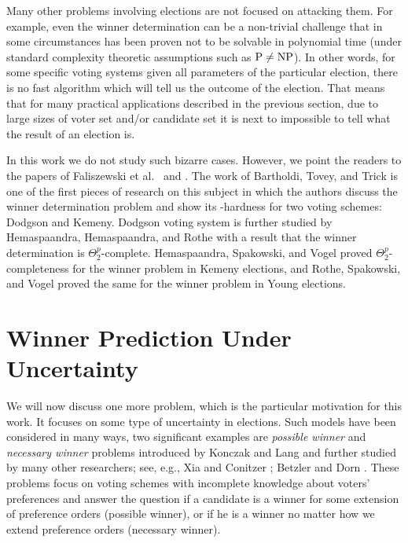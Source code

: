 Many other problems involving elections are not focused on attacking them.
For example, even the winner determination can be a non-trivial challenge that in some circumstances has been proven not to be solvable in polynomial time (under standard complexity theoretic assumptions such as $\textnormal{P}\ne\textnormal{NP}$).
In other words, for some specific voting systems given all parameters of the particular election, there is no fast algorithm which will tell us the outcome of the election.
That means that for many practical applications described in the previous section, due to large sizes of voter set and/or candidate set it is next to impossible to tell what the result of an election is.

In this work we do not study such bizarre cases.
However, we point the readers to the papers of Faliszewski et al.\ \cite{faliszewski} and \cite{faliszewski2}.
The work of Bartholdi, Tovey, and Trick \cite{bartholdi} is one of the first pieces of research on this subject in which the authors discuss the winner determination problem and show its \NPclass-hardness for two voting schemes: Dodgson and Kemeny.
Dodgson voting system is further studied by Hemaspaandra, Hemaspaandra, and Rothe \cite{hemaspaandra2} with a result that the winner determination is $\Theta_2^p$-complete.
Hemaspaandra, Spakowski, and Vogel \cite{hemaspaandra3} proved $\Theta^p_2$-completeness for the winner problem in Kemeny elections, and Rothe, Spakowski, and Vogel \cite{rothe} proved the same for the winner problem in Young elections.

\section{Winner Prediction Under Uncertainty} \label{sec:winner-prediction}

We will now discuss one more problem, which is the particular motivation for this work.
It focuses on some type of uncertainty in elections.
Such models have been considered in many ways, two significant examples are \emph{possible winner} and \emph{necessary winner} problems introduced by Konczak and Lang \cite{konczak} and further studied by many other researchers; see, e.g., Xia and Conitzer \cite{xia}; Betzler and Dorn \cite{betzler}.
These problems focus on voting schemes with incomplete knowledge about voters' preferences and answer the question if a candidate is a winner for some extension of preference orders (possible winner), or if he is a winner no matter how we extend preference orders (necessary winner).

